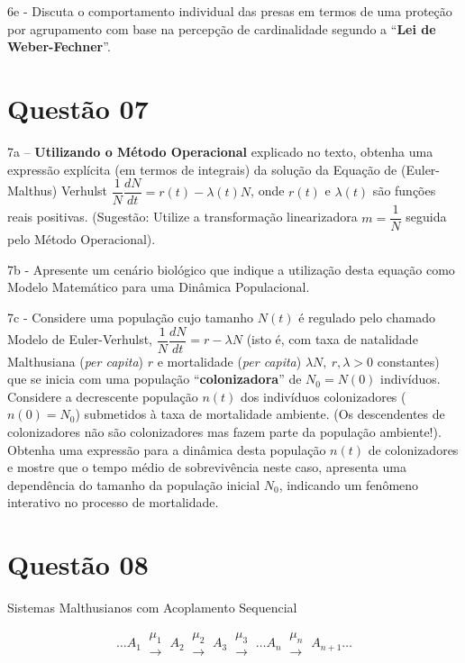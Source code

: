     6e - Discuta o comportamento individual das presas em termos de uma proteção por agrupamento com base na percepção de cardinalidade segundo a ``\textbf{Lei de Weber-Fechner}''.



\section*{Questão 07}


    7a – \textbf{Utilizando o Método Operacional} explicado no texto, obtenha uma expressão explícita (em termos de integrais) da solução da Equação de (Euler-Malthus) Verhulst \(\dfrac{1}{N} \dfrac{dN}{dt} = r(t) - \lambda(t)N\), onde \(r(t)\) e \(\lambda(t)\) são funções reais positivas. (Sugestão: Utilize a transformação linearizadora \(m = \dfrac{1}{N}\) seguida pelo Método Operacional).

    7b - Apresente um cenário biológico que indique a utilização desta equação como Modelo Matemático para uma Dinâmica Populacional.

    7c - Considere uma população cujo tamanho \(N(t)\) é regulado pelo chamado Modelo de Euler-Verhulst, \(\dfrac{1}{N} \dfrac{dN}{dt} = r - \lambda N\) (isto é, com taxa de natalidade Malthusiana (\textit{per capita}) \(r\) e mortalidade (\textit{per capita}) \(\lambda N,\ r, \lambda > 0\) constantes) que se inicia com uma população ``\textbf{colonizadora}'' de \(N_0 = N(0)\) indivíduos. Considere a decrescente população \(n(t)\) dos indivíduos colonizadores (\(n(0) = N_0\)) submetidos à taxa de mortalidade ambiente. ({\small Os descendentes de colonizadores não são colonizadores mas fazem parte da população ambiente!}). Obtenha uma expressão para a dinâmica desta população \(n(t)\) de colonizadores e mostre que o tempo médio de sobrevivência neste caso, apresenta uma dependência do tamanho da população inicial \(N_0\), indicando um fenômeno interativo no processo de mortalidade.



\section*{Questão 08}

    Sistemas Malthusianos com Acoplamento Sequencial

    \[\ldots
    A_1 \ \substack{\mu_1 \\ \longrightarrow} \
    A_2 \ \substack{\mu_2 \\ \longrightarrow} \
    A_3 \ \substack{\mu_3 \\ \longrightarrow} \
    \ldots
    A_n \ \substack{\mu_n \\ \longrightarrow} \
    A_{n+1} \ldots\]
    
